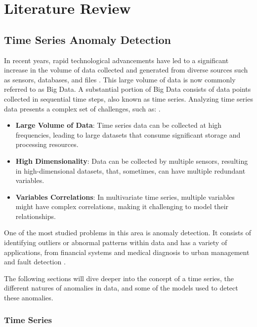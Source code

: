\chapter{Literature Review}\label{sec2_revisao_lit}
\section{Time Series Anomaly Detection}

In recent years, rapid technological advancements have led to a significant increase in the volume of data collected and generated from diverse sources such as sensors, databases, and files \cite{attoh2017big}. This large volume of data is now commonly referred to as Big Data. A substantial portion of Big Data consists of data points collected in sequential time steps, also known as time series. Analyzing time series data presents a complex set of challenges, such as: \cite{Tsai_Lai_Chao_Vasilakos_2015}. 

\begin{itemize}
    \item \textbf{Large Volume of Data}: Time series data can be collected at high frequencies, leading to large datasets that consume significant storage and processing resources.
    \item \textbf{High Dimensionality}: Data can be collected by multiple sensors, resulting in high-dimensional datasets, that, sometimes, can have multiple redundant variables.
    \item \textbf{Variables Correlations}: In multivariate time series, multiple variables might have complex correlations, making it challenging to model their relationships.
\end{itemize}

One of the most studied problems in this area is anomaly detection. It consists of identifying outliers or abnormal patterns within data and has a variety of applications, from financial systems and medical diagnosis to urban management and fault detection \cite{Samariya_Thakkar_2021}. 

The following sections will dive deeper into the concept of a time series, the different natures of anomalies in data, and some of the models used to detect these anomalies.

\subsection{Time Series} \label{sec-time-series}

